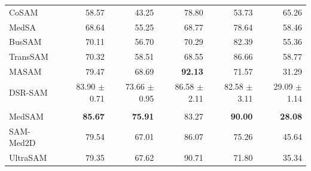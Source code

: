 \documentclass[10pt]{article}
\begin{document}
{\begin{longtable}{lrrrrr}
CoSAM & 58.57 & 43.25 & 78.80 & 53.73 & 65.26 \\
MedSA & 68.64 & 55.25 & 68.77 & 78.64 & 58.46 \\
BusSAM & 70.11 & 56.70 & 70.29 & 82.39 & 55.36 \\
TransSAM & 70.32 & 58.51 & 68.55 & 86.66 & 58.77 \\
MASAM & 79.47 & 68.69 & \textbf{92.13} & 71.57 & 31.29 \\
DSR-SAM & 83.90 $\pm$ 0.71 & 73.66 $\pm$ 0.95 & 86.58 $\pm$ 2.11 & 82.58 $\pm$ 3.11 & 29.09 $\pm$ 1.14 \\
\addlinespace[2pt]
\multicolumn{6}{l}{\textit{Zero-shot foundation models}} \\
MedSAM & \textbf{85.67} & \textbf{75.91} & 83.27 & \textbf{90.00} & \textbf{28.08} \\
SAM-Med2D & 79.54 & 67.01 & 86.07 & 75.26 & 45.64 \\
UltraSAM & 79.35 & 67.62 & 90.71 & 71.80 & 35.34 \\
\end{longtable}
}

\newpage
\end{document}
